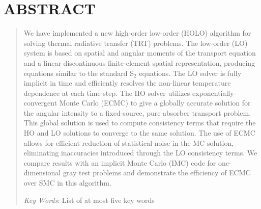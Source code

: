 \documentclass{mc2013}
\begin{document}
\section*{ABSTRACT} 
\begin{quote}
\begin{small}
We have implemented a new high-order low-order (HOLO) algorithm for solving
thermal radiative transfer (TRT) problems.  The low-order (LO) system is based on spatial
and angular moments of the transport equation and a linear discontinuous
finite-element spatial representation, producing equations similar to the standard
S$_2$ equations.  
The LO solver is fully implicit in time and efficiently resolves the non-linear
temperature dependence at each time step.   The HO solver
utilizes exponentially-convergent Monte Carlo (ECMC) to give a globally accurate solution
for the angular intensity to a fixed-source, pure absorber transport problem.  This global solution is used to compute consistency terms
that require the HO and LO solutions to converge to the same solution.  The use of ECMC
allows for efficient reduction of statistical noise in the MC solution, eliminating
inaccuracies introduced through the LO consistency
terms.  We compare results with an
implicit Monte Carlo (IMC) code for one-dimensional gray test problems and 
demonstrate the efficiency of ECMC over SMC in this algorithm.

\emph{Key Words}: List of at most five key words

\end{small} 
\end{quote}

\setlength{\baselineskip}{14pt}
\normalsize

\end{document}
